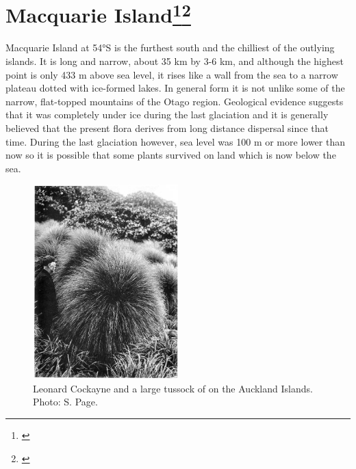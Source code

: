 \section[Macquarie Island]{Macquarie Island\footnote{\cite{taylor1955flora}}\footnote{\cite{seppelt1984vascular}}}

Macquarie Island at 54°S is the furthest south and the chilliest of the outlying islands.
It is long and narrow, about 35 km by 3-6 km, and although the highest point is only 433 m above sea level, it rises like a wall from the sea to a narrow plateau dotted with ice-formed lakes.
In general form it is not unlike some of the narrow, flat-topped mountains of the Otago region.
Geological evidence suggests that it was completely under ice during the last glaciation and it is generally believed that the present flora derives from long distance dispersal since that time.
During the last glaciation however, sea level was 100 m or more lower than now so it is possible that some plants survived on land which is now below the sea.

\begin{figure}
	\includegraphics[width=0.5\textwidth]{graphics/figure115cockayne.jpg}
	\centering
	\caption[Leonard Cockayne and a large tussock]{Leonard Cockayne and a large tussock of  on the Auckland Islands.
	Photo: S. Page.}
	\label{fig:115cockayne}
\end{figure}

